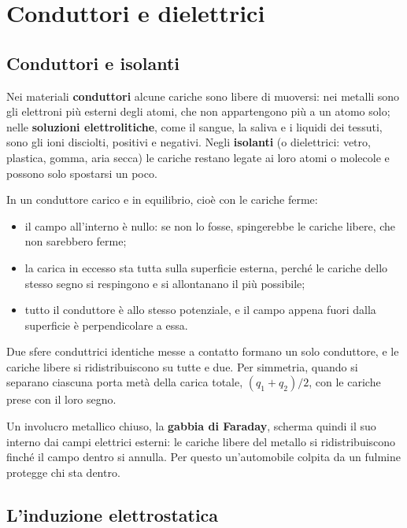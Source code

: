 \section{Conduttori e dielettrici}
\label{sec:ud6-materia}

\subsection{Conduttori e isolanti}

Nei materiali \textbf{conduttori} alcune cariche sono libere di muoversi: nei metalli sono gli elettroni più esterni degli atomi, che non appartengono più a un atomo solo; nelle \textbf{soluzioni elettrolitiche}, come il sangue, la saliva e i liquidi dei tessuti, sono gli ioni disciolti, positivi e negativi. Negli \textbf{isolanti} (o dielettrici: vetro, plastica, gomma, aria secca) le cariche restano legate ai loro atomi o molecole e possono solo spostarsi un poco.

In un conduttore carico e in equilibrio, cioè con le cariche ferme:
\begin{itemize}
  \item il campo all'interno è nullo: se non lo fosse, spingerebbe le cariche libere, che non sarebbero ferme;
  \item la carica in eccesso sta tutta sulla superficie esterna, perché le cariche dello stesso segno si respingono e si allontanano il più possibile;
  \item tutto il conduttore è allo stesso potenziale, e il campo appena fuori dalla superficie è perpendicolare a essa.
\end{itemize}
Due sfere conduttrici identiche messe a contatto formano un solo conduttore, e le cariche libere si ridistribuiscono su tutte e due. Per simmetria, quando si separano ciascuna porta metà della carica totale, $(q_1 + q_2)/2$, con le cariche prese con il loro segno.

Un involucro metallico chiuso, la \textbf{gabbia di Faraday}, scherma quindi il suo interno dai campi elettrici esterni: le cariche libere del metallo si ridistribuiscono finché il campo dentro si annulla. Per questo un'automobile colpita da un fulmine protegge chi sta dentro.

\subsection{L'induzione elettrostatica}

